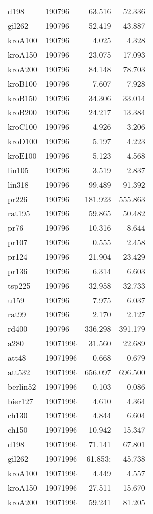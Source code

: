 \begin{center}
\begin{longtable}{llrr}
d198  & 190796 & 63.516& 52.336\\
gil262  & 190796 & 52.419& 43.887\\
kroA100  & 190796 & 4.025& 4.328\\
kroA150  & 190796 & 23.075& 17.093\\
kroA200  & 190796 & 84.148& 78.703\\
kroB100  & 190796 & 7.607& 7.928\\
kroB150  & 190796 & 34.306& 33.014\\
kroB200  & 190796 & 24.217& 13.384\\
kroC100  & 190796 & 4.926& 3.206\\
kroD100  & 190796 & 5.197& 4.223\\
kroE100  & 190796 & 5.123& 4.568\\
lin105  & 190796 & 3.519& 2.837\\
lin318  & 190796 & 99.489& 91.392\\
pr226  & 190796  & 181.923& 555.863\\
rat195  & 190796 & 59.865& 50.482\\
pr76  & 190796 &10.316& 8.644\\
pr107  & 190796 & 0.555& 2.458\\
pr124  & 190796 & 21.904& 23.429\\
pr136  & 190796 & 6.314& 6.603\\
tsp225  & 190796 & 32.958& 32.733\\
u159  & 190796 & 7.975& 6.037\\
rat99  & 190796 & 2.170& 2.127\\
rd400  & 190796 & 336.298& 391.179\\
a280  & 19071996 & 31.560& 22.689\\
att48  & 19071996 & 0.668& 0.679\\
att532  & 19071996 & 656.097& 696.500\\
berlin52  & 19071996 & 0.103 & 0.086\\
bier127  & 19071996 & 4.610& 4.364\\
ch130  & 19071996 & 4.844& 6.604\\
ch150  & 19071996 & 10.942& 15.347\\
d198  & 19071996 & 71.141& 67.801\\
gil262  & 19071996 &61.853;&45.738\\
kroA100  & 19071996 & 4.449& 4.557\\
kroA150  & 19071996 &27.511& 15.670\\
kroA200  & 19071996 & 59.241& 81.205\\

\end{longtable}
\end{center}

